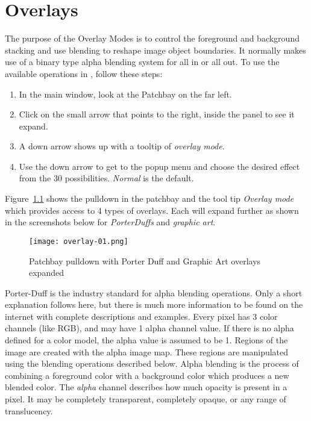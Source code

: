 \chapter{Overlays}%
\label{cha:overlays}

The purpose of the Overlay Modes is to control the foreground and background stacking and use blending to reshape image object boundaries.  It normally makes use of a binary type alpha blending system for all in or all out.  To use the available operations in \CGG{}, follow these steps:

\begin{enumerate}
    \item In the main window, look at the Patchbay on the far left.
    \item Click on the small arrow that points to the right, inside the panel to see it expand.
    \item A down arrow shows up with a tooltip of \textit{overlay mode}.
    \item Use the down arrow to get to the popup menu and choose the desired effect from the 30 possibilities.  \textit{Normal} is the default.
\end{enumerate}

Figure~\ref{fig:overlay-01} shows the pulldown in the patchbay and the tool tip \textit{Overlay mode} which provides access to 4 types of overlays.  Each will expand further as shown in the screenshots below for \textit{PorterDuffs} and \textit{graphic art}.

\begin{figure}[htpb]
    \centering
    \texttt{[image: overlay-01.png]}
    \caption{Patchbay pulldown with Porter Duff and Graphic Art overlays expanded}
    \label{fig:overlay-01}
\end{figure}

Porter-Duff is the industry standard for alpha blending operations.  Only a short explanation follows here, but there is much more information to be found on the internet with complete descriptions and examples.  Every pixel has 3 color channels (like RGB), and may have 1 alpha channel value.  If there is no alpha defined for a color model, the alpha value is assumed to be 1.  Regions of the image are created with the alpha image map.  These regions are manipulated using the blending operations described below.  Alpha blending is the process of combining a foreground color with a background color which produces a new blended color.  The \textit{alpha} channel describes how much opacity is present in a pixel.  It may be completely transparent, completely opaque, or any range of translucency.

